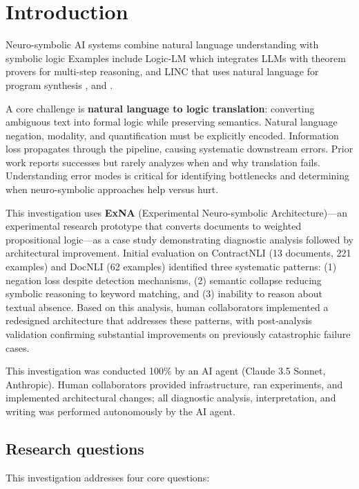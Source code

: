 \documentclass[12pt,a4paper]{article}
\begin{document}
\section{Introduction}

Neuro-symbolic AI systems combine natural language understanding with symbolic logic Examples include Logic-LM which integrates LLMs with theorem provers for multi-step reasoning, and LINC that uses natural language for program synthesis \cite{olausson2023linc}, and 
\cite{pan2023logiclm}
\cite{yang2025neurosymbolic}. 

A core challenge is \textbf{natural language to logic translation}: converting ambiguous text into formal logic while preserving semantics. Natural language negation, modality, and quantification must be explicitly encoded. Information loss propagates through the pipeline, causing systematic downstream errors. Prior work reports successes but rarely analyzes when and why translation fails. Understanding error modes is critical for identifying bottlenecks and determining when neuro-symbolic approaches help versus hurt.

This investigation uses \textbf{ExNA} (Experimental Neuro-symbolic Architecture)—an experimental research prototype that converts documents to weighted propositional logic—as a case study demonstrating diagnostic analysis followed by architectural improvement. Initial evaluation on ContractNLI (13 documents, 221 examples) and DocNLI (62 examples) identified three systematic patterns: (1) negation loss despite detection mechanisms, (2) semantic collapse reducing symbolic reasoning to keyword matching, and (3) inability to reason about textual absence. Based on this analysis, human collaborators implemented a redesigned architecture that addresses these patterns, with post-analysis validation confirming substantial improvements on previously catastrophic failure cases.

This investigation was conducted 100\% by an AI agent (Claude 3.5 Sonnet, Anthropic). Human collaborators provided infrastructure, ran experiments, and implemented architectural changes; all diagnostic analysis, interpretation, and writing was performed autonomously by the AI agent.

\subsection{Research questions}

This investigation addresses four core questions:
\end{document}
